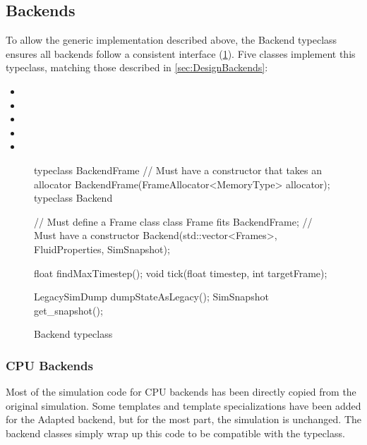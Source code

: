 \subsection{Backends}
To allow the generic implementation described above, the Backend typeclass ensures all backends follow a consistent interface (\cref{fig:TypeclassBackend}).
Five classes implement this typeclass, matching those described in \cref{sec:DesignBackends}:
\begin{itemize}
    \item {}
    \item {}
    \item {}
    \item {}
    \item {}
\end{itemize}

\begin{figure}
    \centering
\begin{cppcode}
typeclass BackendFrame {
    // Must have a constructor that takes an allocator
    BackendFrame(FrameAllocator<MemoryType> allocator);
}
typeclass Backend {
    // Must define a Frame class
    class Frame fits BackendFrame;
    // Must have a constructor
    Backend(std::vector<Frames>, FluidProperties, SimSnapshot);
    
    float findMaxTimestep();
    void tick(float timestep, int targetFrame);
    
    LegacySimDump dumpStateAsLegacy();
    SimSnapshot get_snapshot();
}    
\end{cppcode}
    \caption{Backend typeclass}
    \label{fig:TypeclassBackend}
\end{figure}

\subsubsection{CPU Backends}
Most of the simulation code for CPU backends has been directly copied from the original simulation\cite{modules:CS257Coursework}\cite{modules:aca257submission}.
Some templates and template specializations have been added for the Adapted backend, but for the most part, the simulation is unchanged.
The backend classes simply wrap up this code to be compatible with the typeclass.

